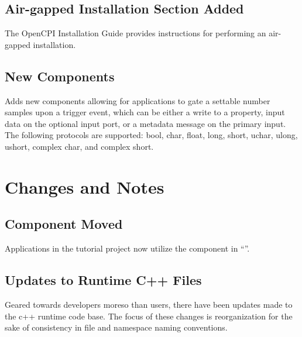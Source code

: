 \subsection{Air-gapped Installation Section Added}
\label{sec:24_air-gap_install}
The OpenCPI Installation Guide provides instructions for performing an air-gapped installation.\\

\subsection{New  Components}
\label{sec:24_sdr_triggered_sampler}
Adds new  components allowing for applications to gate a settable number samples upon a trigger event, which can be either a write to a property, input data on the optional input port, or a metadata message on the primary input. The following protocols are supported: bool, char, float, long, short, uchar, ulong, ushort, complex char, and complex short.\\

\section{Changes and Notes}

\subsection{ Component Moved}
\label{sec:24_complex_mixer_moved}
Applications in the tutorial project now utilize the  component in ``''.\\

\subsection{Updates to Runtime C++ Files}
\label{sec:24_runtime_c++}
Geared towards developers moreso than users, there have been updates made to the c++ runtime code base. The focus of these changes is reorganization for the sake of consistency in file and namespace naming conventions. \\

